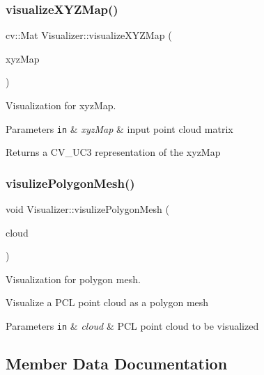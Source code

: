 \subsubsection{\texorpdfstring{visualize\+X\+Y\+Z\+Map()}{visualizeXYZMap()}}
{\footnotesize\ttfamily cv\+::\+Mat Visualizer\+::visualize\+X\+Y\+Z\+Map (\begin{DoxyParamCaption}\item[{cv\+::\+Mat \&}]{xyz\+Map }\end{DoxyParamCaption})\hspace{0.3cm}{\ttfamily [static]}}



Visualization for xyz\+Map. 


\begin{DoxyParams}[1]{Parameters}
\mbox{\tt in}  & {\em xyz\+Map} & input point cloud matrix \\
\hline
\end{DoxyParams}
\begin{DoxyReturn}{Returns}
a C\+V\+\_\+U\+C3 representation of the xyz\+Map 
\end{DoxyReturn}
\hypertarget{class_visualizer_a82702715f2ac30e555ccad3339375bf8}{}\label{class_visualizer_a82702715f2ac30e555ccad3339375bf8} 
\subsubsection{\texorpdfstring{visulize\+Polygon\+Mesh()}{visulizePolygonMesh()}}
{\footnotesize\ttfamily void Visualizer\+::visulize\+Polygon\+Mesh (\begin{DoxyParamCaption}\item[{pcl\+::\+Point\+Cloud$<$ pcl\+::\+Point\+X\+YZ $>$\+::Ptr}]{cloud }\end{DoxyParamCaption})\hspace{0.3cm}{\ttfamily [static]}}



Visualization for polygon mesh. 

Visualize a P\+CL point cloud as a polygon mesh 
\begin{DoxyParams}[1]{Parameters}
\mbox{\tt in}  & {\em cloud} & P\+CL point cloud to be visualized \\
\hline
\end{DoxyParams}


\subsection{Member Data Documentation}
\hypertarget{class_visualizer_a82cad28f5c39579414f73bda01d11000}{}\label{class_visualizer_a82cad28f5c39579414f73bda01d11000} 
